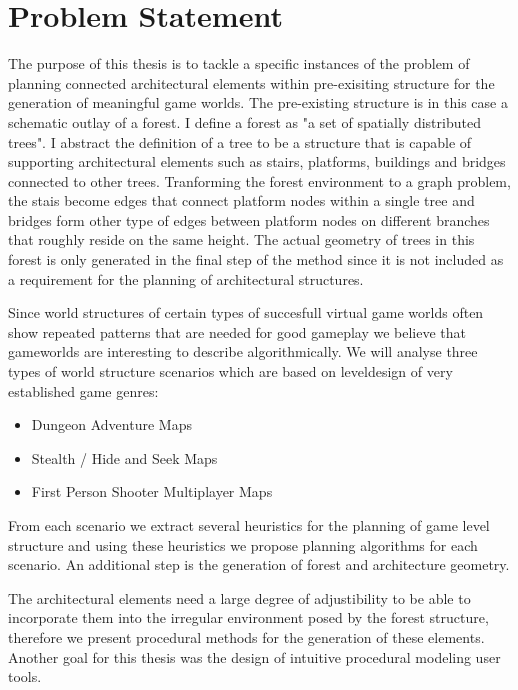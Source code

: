\chapter{Problem Statement}
\label{sec:problem}


The purpose of this thesis is to tackle a specific instances of the problem of planning connected architectural elements within pre-exisiting structure for the generation of meaningful game worlds. The pre-existing structure is in this case a schematic outlay of a forest. I define a forest as "a set of spatially distributed trees". I abstract the definition of a tree to be a structure that is capable of supporting architectural elements such as stairs, platforms, buildings and bridges connected to other trees. 
Tranforming the forest environment to a graph problem, the stais become edges that connect platform nodes within a single tree and bridges form other type of edges between platform nodes on different branches that roughly reside on the same height. The actual geometry of trees in this forest is only generated in the final step of the method since it is not included as a requirement for the planning of architectural structures. 

Since world structures of certain types of succesfull virtual game worlds often show repeated patterns that are needed for good gameplay we believe that gameworlds are interesting to describe algorithmically. We will analyse three types of world structure scenarios which are based on leveldesign of very established game genres: 

\begin{itemize}
\item Dungeon Adventure Maps 
\item Stealth / Hide and Seek Maps 
\item First Person Shooter Multiplayer Maps 
\end{itemize} 

From each scenario we extract several heuristics for the planning of game level structure and using these heuristics we propose planning algorithms for each scenario. An additional step is the generation of forest and architecture geometry.  

The architectural elements need a large degree of adjustibility to be able to incorporate them into the irregular environment posed by the forest structure, therefore we present procedural methods for the generation of these elements. Another goal for this thesis was the design of intuitive procedural modeling user tools.      

